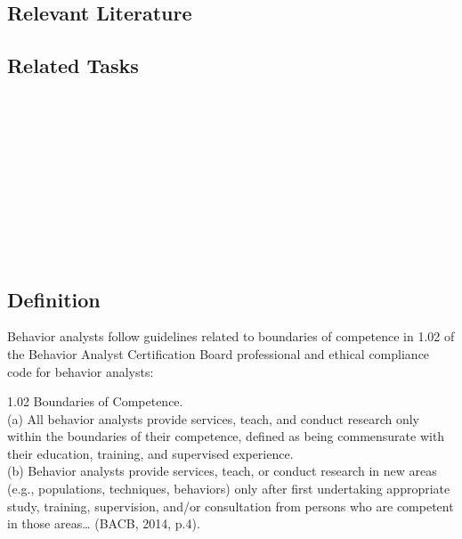 \subsection{Relevant Literature}
\begin{refsection}
\nocite{test,alang2017police,clayton2018black}
\printbibliography[heading=none]
\end{refsection}
%
\subsection{Related Tasks}
\fourgFour{}\\
\fourgSeven{}\\
\fourgEight{}\\
\fouriSix{}\\
\fourjEleven{}\\
\fourjFourteen{}\\
\fourkThree{}\\
\fourkEight{}\\
\fourkNine{}\\
%
%
%
%
%
%
\section[\fourgSeven{}]{\fourgSeven{}%
              }
\subsection{Definition}
Behavior analysts follow guidelines related to boundaries of competence in 1.02 of the Behavior Analyst Certification Board professional and ethical compliance code for behavior analysts:

1.02 Boundaries of Competence.\\
(a) All behavior analysts provide services, teach, and conduct research only within the boundaries of their competence, defined as being commensurate with their education, training, and supervised experience. \\
(b) Behavior analysts provide services, teach, or conduct research in new areas (e.g., populations, techniques, behaviors) only after first undertaking appropriate study, training, supervision, and/or consultation from persons who are competent in those areas… (BACB, 2014, p.4).\\

